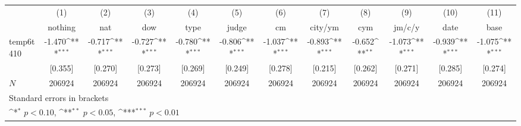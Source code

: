 {
\def\sym#1{\ifmmode^{#1}\else\(^{#1}\)\fi}
\begin{tabular}{l*{11}{c}}
\hline\hline
            &\multicolumn{1}{c}{(1)}&\multicolumn{1}{c}{(2)}&\multicolumn{1}{c}{(3)}&\multicolumn{1}{c}{(4)}&\multicolumn{1}{c}{(5)}&\multicolumn{1}{c}{(6)}&\multicolumn{1}{c}{(7)}&\multicolumn{1}{c}{(8)}&\multicolumn{1}{c}{(9)}&\multicolumn{1}{c}{(10)}&\multicolumn{1}{c}{(11)}\\
            &\multicolumn{1}{c}{nothing}&\multicolumn{1}{c}{nat}&\multicolumn{1}{c}{dow}&\multicolumn{1}{c}{type}&\multicolumn{1}{c}{judge}&\multicolumn{1}{c}{cm}&\multicolumn{1}{c}{city/ym}&\multicolumn{1}{c}{cym}&\multicolumn{1}{c}{jm/c/y}&\multicolumn{1}{c}{date}&\multicolumn{1}{c}{base}\\
\hline
temp6t410   &      -1.470\sym{***}&      -0.717\sym{***}&      -0.727\sym{***}&      -0.780\sym{***}&      -0.806\sym{***}&      -1.037\sym{***}&      -0.893\sym{***}&      -0.652\sym{**} &      -1.073\sym{***}&      -0.939\sym{***}&      -1.075\sym{***}\\
            &     [0.355]         &     [0.270]         &     [0.273]         &     [0.269]         &     [0.249]         &     [0.278]         &     [0.215]         &     [0.262]         &     [0.271]         &     [0.285]         &     [0.274]         \\
\hline
\(N\)       &      206924         &      206924         &      206924         &      206924         &      206924         &      206924         &      206924         &      206924         &      206924         &      206924         &      206924         \\
\hline\hline
\multicolumn{12}{l}{\footnotesize Standard errors in brackets}\\
\multicolumn{12}{l}{\footnotesize \sym{*} \(p<0.10\), \sym{**} \(p<0.05\), \sym{***} \(p<0.01\)}\\
\end{tabular}
}
